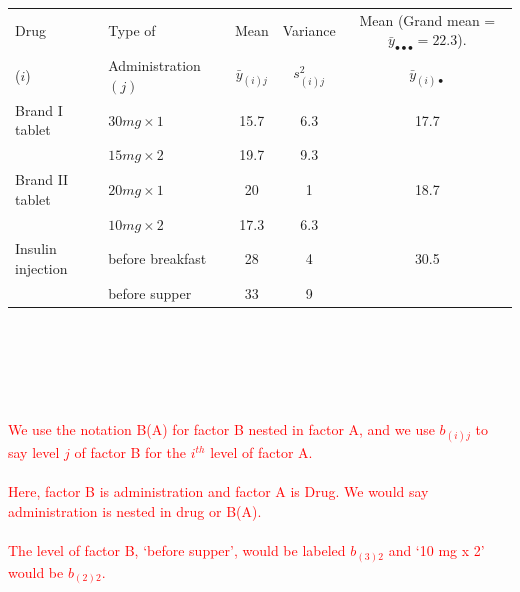 \begin{center}
\begin{tabular}{|llccc|} \hline
Drug & Type of & Mean & Variance & Mean (Grand mean = $\bar{y}_{\bullet\bullet\bullet}=22.3$).\\
($i$) & Administration $(j)$ & $\bar{y}_{(i)j}$ & $s_{(i)j}^2$ & $\bar{y}_{(i)\bullet}$\\ \hline
Brand I tablet & $30 mg \times 1$ & 15.7 & 6.3 & 17.7\\
& $15 mg \times 2$ & 19.7 & 9.3 & \\
Brand II tablet & $20 mg \times 1$ & 20 & 1 & 18.7 \\
& $10 mg \times 2$ & 17.3 & 6.3 & \\
Insulin injection & before breakfast  & 28  & 4 & 30.5\\
& before supper & 33 & 9 & \\ \hline
\end{tabular}
\end{center}
~\\~\\~\\~\\~\\
\textcolor{red}{We use the notation B(A) for factor B nested in factor A, and we use $b_{(i)j}$ to say level $j$ of factor B for the $i^{th}$ level of factor A.  \\~\\
Here, factor B is administration and factor A is Drug.  We would say administration is nested in drug or B(A).  \\~\\
The level of factor B, `before supper', would be labeled $b_{(3)2}$ and `10 mg x 2' would be $b_{(2)2}$.\\~\\}

\newpage

